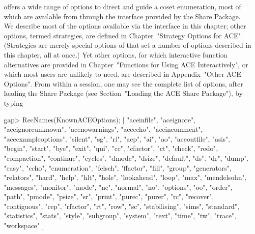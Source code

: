 

{\ACE} offers a wide range of options to  direct  and  guide  a  coset
enumeration, most of which  are  available  from  {\GAP}  through  the
interface provided by the {\ACE} Share Package. We  describe  most  of
the options  available  via  the  interface  in  this  chapter;  other
options, termed strategies, are defined in  Chapter~"Strategy  Options
for ACE". (Strategies are merely special options of {\ACE} that set  a
number of options described in this chapter, all at once.)  Yet  other
options, for which interactive function alternatives are  provided  in
Chapter~"Functions for Using ACE Interactively", or which most  {\GAP}
users are unlikely to  need,  are  described  in  Appendix~"Other  ACE
Options". From within a {\GAP} session, one may see the complete  list
of {\ACE}  options,  after  loading  the  {\ACE}  Share  Package  (see
Section~"Loading the ACE Share Package"), by typing

\beginexample
gap> RecNames(KnownACEOptions);
[ "aceinfile", "aceignore", "aceignoreunknown", "acenowarnings", "aceecho", 
  "aceincomment", "aceexampleoptions", "silent", "sg", "rl", "aep", "ai", 
  "ao", "aceoutfile", "asis", "begin", "start", "bye", "exit", "qui", "cc", 
  "cfactor", "ct", "check", "redo", "compaction", "continue", "cycles", 
  "dmode", "dsize", "default", "ds", "dr", "dump", "easy", "echo", 
  "enumeration", "felsch", "ffactor", "fill", "group", "generators", 
  "relators", "hard", "help", "hlt", "hole", "lookahead", "loop", "max", 
  "mendelsohn", "messages", "monitor", "mode", "nc", "normal", "no", 
  "options", "oo", "order", "path", "pmode", "psize", "sr", "print", "purec", 
  "purer", "rc", "recover", "contiguous", "rep", "rfactor", "rt", "row", 
  "sc", "stabilising", "sims", "standard", "statistics", "stats", "style", 
  "subgroup", "system", "text", "time", "tw", "trace", "workspace" ]
\endexample

